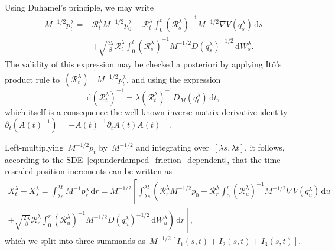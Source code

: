 \documentclass[10pt]{article}
\newcommand{\cR}{\mathcal{R}}
\renewcommand{\d}{\mathrm{d}}
\newcommand{\1}{\mathbbm 1}
\begin{document}
Using Duhamel's principle, we may write
\begin{equation}
    \begin{aligned}
        M^{-1/2}p^\lambda_t = &\cR_{t}^\lambda M^{-1/2}p_0^\lambda - \cR_t^\lambda\int_0^t (\cR_{s}^\lambda)^{-1}M^{-1/2}\nabla V(q_s^\lambda)\,\d s\\
        &+\sqrt{\frac{2\lambda}{\beta}}\cR_t^\lambda\int_0^t (\cR_{s}^\lambda)^{-1} M^{-1/2}D(q_s^\lambda)^{-1/2}\,\d W^\lambda_s.
    \end{aligned}
\end{equation}
The validity of this expression may be checked a posteriori by applying Itô's product rule to~$(\cR_t^\lambda)^{-1}M^{-1/2}p_t^\lambda$, and using the expression
\begin{equation}
    \label{eq:matrix_diff_expr}
    \d\left(\cR_t^\lambda\right)^{-1} = \lambda \left(\cR_t^\lambda\right)^{-1}D_M(q_t^\lambda)\,\d t,
\end{equation}
which itself is a consequence the well-known inverse matrix derivative identity ${\partial_t (A(t)^{-1}) = - A(t)^{-1}\partial_t A(t) A(t)^{-1}}$.


Left-multiplying~$M^{-1/2}p_t$ by~$M^{-1/2}$ and integrating over~$[\lambda s,\lambda t]$, it follows, according to the SDE~\eqref{eq:underdamped_friction_dependent}, that the time-rescaled position increments can be written as
    \begin{equation}
        \begin{aligned}
        X_t^\lambda - X_s^\lambda = \int_{\lambda s}^{\lambda t}M^{-1}p_r^\lambda\,\d r = M^{-1/2}\left[\int_{\lambda s}^{\lambda t}\left(\cR_{r}^\lambda M^{-1/2}p_0-\cR_r^\lambda\int_0^r (\cR_{u}^\lambda)^{-1}M^{-1/2}\nabla V(q_u^\lambda)\,\d u\right.\right.\\\left.\left.+\sqrt{\frac{2\lambda}{\beta}}\cR^\lambda_r\int_0^r \left(\cR_{u}^{\lambda}\right)^{-1}M^{-1/2} D(q_u^\lambda)^{-1/2}\,\d W^\lambda_u\right)\,\d r\right],
    \end{aligned}
\end{equation}
which we split into three summands as~$M^{-1/2}\left[I_1(s,t)+I_2(s,t)+I_3(s,t)\right]$.
\end{document}

